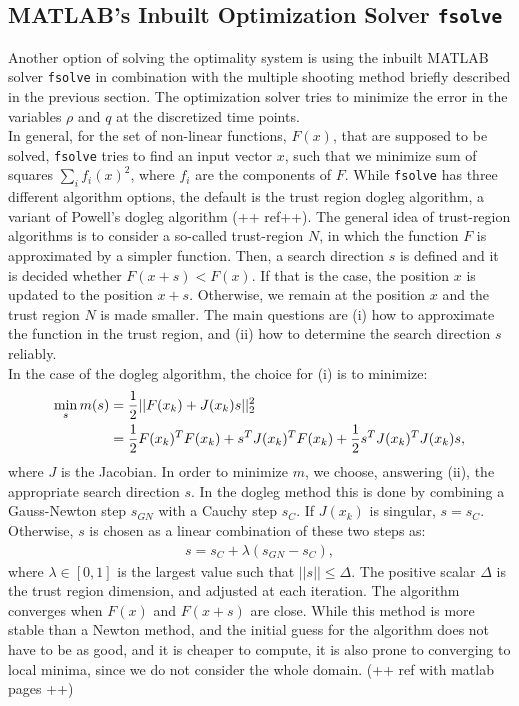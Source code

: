 \documentclass[11pt, a4paper]{article}
\theoremstyle{definition}
\newcommand{\adj}{q}
\begin{document}
\subsection{{\scshape MATLAB}'s Inbuilt Optimization Solver \texttt{fsolve}}
Another option of solving the optimality system is using the inbuilt {\scshape MATLAB} solver \texttt{fsolve} in combination with the multiple shooting method briefly described in the previous section. The optimization solver tries to minimize the error in the variables $\rho$ and $\adj$ at the discretized time points. 
\\
In general, for the set of non-linear functions, $F(x)$, that are supposed to be solved, \texttt{fsolve} tries to find an input vector $x$, such that we minimize sum of squares $\sum_i f_i(x)^2$, where $f_i$ are the components of $F$. 
While \texttt{fsolve} has three different algorithm options, the default is the trust region dogleg algorithm, a variant of Powell's dogleg algorithm (++ ref++).   
The general idea of trust-region algorithms is to consider a so-called trust-region $N$, in which the function $F$ is approximated by a simpler function. Then, a search direction $s$ is defined and it is decided whether $F(x+s) < F(x)$. If that is the case, the position $x$ is updated to the position $x+s$. Otherwise, we remain at the position $x$ and the trust region $N$ is made smaller.
The main questions are (i) how to approximate the function in the trust region, and (ii) how to determine the search direction $s$ reliably.\\
In the case of the dogleg algorithm, the choice for (i) is to minimize:
\begin{align}
\label{eqn:trustregionsubprob1}
\min_s m(s) &= \frac{1}{2}|| F(x_k) + J(x_k)s||_2^2 \\
&= \frac{1}{2}F(x_k)^T F(x_k) + s^T J(x_k)^T F(x_k) + \frac{1}{2}s^T J(x_k)^TJ(x_k)s, \notag
\end{align}
where $J$ is the Jacobian.
In order to minimize $m$, we choose, answering (ii), the appropriate search direction $s$. In the dogleg method this is done by combining a Gauss-Newton step $s_{GN}$ with a Cauchy step $s_C$.
If $J(x_k)$ is singular, $s = s_C$. Otherwise, $s$ is chosen as a linear combination of these two steps as:
\begin{align*}
s = s_C + \lambda(s_{GN} - s_C),
\end{align*}
where $\lambda \in [0,1]$ is the largest value such that $||s|| \leq \Delta$. The positive scalar $\Delta$ is the trust region dimension, and adjusted at each iteration. The algorithm converges when $F(x)$ and $F(x+s)$ are close. 
While this method is more stable than a Newton method, and the initial guess for the algorithm does not have to be as good, and it is cheaper to compute, it is also prone to converging to local minima, since we do not consider the whole domain.
(++ ref with matlab pages ++)
\end{document}

